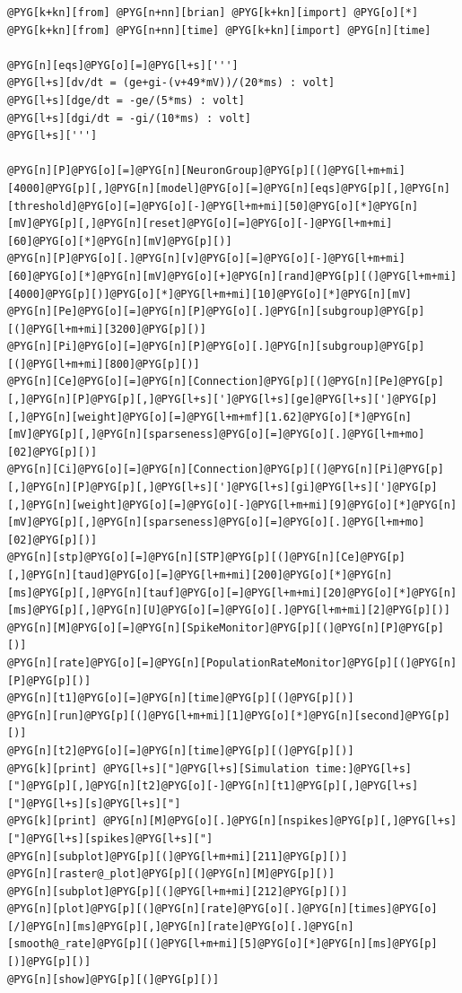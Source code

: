 \documentclass[letterpaper,10pt,english]{manual}
\begin{document}
\begin{Verbatim}[commandchars=@\[\]]
@PYG[k+kn][from] @PYG[n+nn][brian] @PYG[k+kn][import] @PYG[o][*]
@PYG[k+kn][from] @PYG[n+nn][time] @PYG[k+kn][import] @PYG[n][time]

@PYG[n][eqs]@PYG[o][=]@PYG[l+s][''']
@PYG[l+s][dv/dt = (ge+gi-(v+49*mV))/(20*ms) : volt]
@PYG[l+s][dge/dt = -ge/(5*ms) : volt]
@PYG[l+s][dgi/dt = -gi/(10*ms) : volt]
@PYG[l+s][''']

@PYG[n][P]@PYG[o][=]@PYG[n][NeuronGroup]@PYG[p][(]@PYG[l+m+mi][4000]@PYG[p][,]@PYG[n][model]@PYG[o][=]@PYG[n][eqs]@PYG[p][,]@PYG[n][threshold]@PYG[o][=]@PYG[o][-]@PYG[l+m+mi][50]@PYG[o][*]@PYG[n][mV]@PYG[p][,]@PYG[n][reset]@PYG[o][=]@PYG[o][-]@PYG[l+m+mi][60]@PYG[o][*]@PYG[n][mV]@PYG[p][)]
@PYG[n][P]@PYG[o][.]@PYG[n][v]@PYG[o][=]@PYG[o][-]@PYG[l+m+mi][60]@PYG[o][*]@PYG[n][mV]@PYG[o][+]@PYG[n][rand]@PYG[p][(]@PYG[l+m+mi][4000]@PYG[p][)]@PYG[o][*]@PYG[l+m+mi][10]@PYG[o][*]@PYG[n][mV]
@PYG[n][Pe]@PYG[o][=]@PYG[n][P]@PYG[o][.]@PYG[n][subgroup]@PYG[p][(]@PYG[l+m+mi][3200]@PYG[p][)]
@PYG[n][Pi]@PYG[o][=]@PYG[n][P]@PYG[o][.]@PYG[n][subgroup]@PYG[p][(]@PYG[l+m+mi][800]@PYG[p][)]
@PYG[n][Ce]@PYG[o][=]@PYG[n][Connection]@PYG[p][(]@PYG[n][Pe]@PYG[p][,]@PYG[n][P]@PYG[p][,]@PYG[l+s][']@PYG[l+s][ge]@PYG[l+s][']@PYG[p][,]@PYG[n][weight]@PYG[o][=]@PYG[l+m+mf][1.62]@PYG[o][*]@PYG[n][mV]@PYG[p][,]@PYG[n][sparseness]@PYG[o][=]@PYG[o][.]@PYG[l+m+mo][02]@PYG[p][)]
@PYG[n][Ci]@PYG[o][=]@PYG[n][Connection]@PYG[p][(]@PYG[n][Pi]@PYG[p][,]@PYG[n][P]@PYG[p][,]@PYG[l+s][']@PYG[l+s][gi]@PYG[l+s][']@PYG[p][,]@PYG[n][weight]@PYG[o][=]@PYG[o][-]@PYG[l+m+mi][9]@PYG[o][*]@PYG[n][mV]@PYG[p][,]@PYG[n][sparseness]@PYG[o][=]@PYG[o][.]@PYG[l+m+mo][02]@PYG[p][)]
@PYG[n][stp]@PYG[o][=]@PYG[n][STP]@PYG[p][(]@PYG[n][Ce]@PYG[p][,]@PYG[n][taud]@PYG[o][=]@PYG[l+m+mi][200]@PYG[o][*]@PYG[n][ms]@PYG[p][,]@PYG[n][tauf]@PYG[o][=]@PYG[l+m+mi][20]@PYG[o][*]@PYG[n][ms]@PYG[p][,]@PYG[n][U]@PYG[o][=]@PYG[o][.]@PYG[l+m+mi][2]@PYG[p][)]
@PYG[n][M]@PYG[o][=]@PYG[n][SpikeMonitor]@PYG[p][(]@PYG[n][P]@PYG[p][)]
@PYG[n][rate]@PYG[o][=]@PYG[n][PopulationRateMonitor]@PYG[p][(]@PYG[n][P]@PYG[p][)]
@PYG[n][t1]@PYG[o][=]@PYG[n][time]@PYG[p][(]@PYG[p][)]
@PYG[n][run]@PYG[p][(]@PYG[l+m+mi][1]@PYG[o][*]@PYG[n][second]@PYG[p][)]
@PYG[n][t2]@PYG[o][=]@PYG[n][time]@PYG[p][(]@PYG[p][)]
@PYG[k][print] @PYG[l+s]["]@PYG[l+s][Simulation time:]@PYG[l+s]["]@PYG[p][,]@PYG[n][t2]@PYG[o][-]@PYG[n][t1]@PYG[p][,]@PYG[l+s]["]@PYG[l+s][s]@PYG[l+s]["]
@PYG[k][print] @PYG[n][M]@PYG[o][.]@PYG[n][nspikes]@PYG[p][,]@PYG[l+s]["]@PYG[l+s][spikes]@PYG[l+s]["]
@PYG[n][subplot]@PYG[p][(]@PYG[l+m+mi][211]@PYG[p][)]
@PYG[n][raster@_plot]@PYG[p][(]@PYG[n][M]@PYG[p][)]
@PYG[n][subplot]@PYG[p][(]@PYG[l+m+mi][212]@PYG[p][)]
@PYG[n][plot]@PYG[p][(]@PYG[n][rate]@PYG[o][.]@PYG[n][times]@PYG[o][/]@PYG[n][ms]@PYG[p][,]@PYG[n][rate]@PYG[o][.]@PYG[n][smooth@_rate]@PYG[p][(]@PYG[l+m+mi][5]@PYG[o][*]@PYG[n][ms]@PYG[p][)]@PYG[p][)]
@PYG[n][show]@PYG[p][(]@PYG[p][)]
\end{Verbatim}
\end{document}
